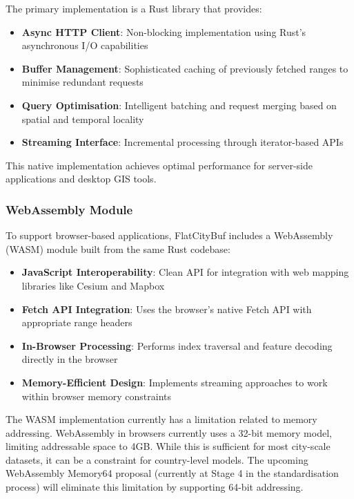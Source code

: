 The primary implementation is a Rust library that provides:

\begin{itemize}
    \item \textbf{Async HTTP Client}: Non-blocking implementation using Rust's asynchronous I/O capabilities
    \item \textbf{Buffer Management}: Sophisticated caching of previously fetched ranges to minimise redundant requests
    \item \textbf{Query Optimisation}: Intelligent batching and request merging based on spatial and temporal locality
    \item \textbf{Streaming Interface}: Incremental processing through iterator-based APIs
\end{itemize}

This native implementation achieves optimal performance for server-side applications and desktop GIS tools.

\subsubsection{WebAssembly Module}
\label{methodology:http_range_requests:cross_platform_implementation:webassembly_module}

To support browser-based applications, FlatCityBuf includes a WebAssembly (WASM) module built from the same Rust codebase:

\begin{itemize}
    \item \textbf{JavaScript Interoperability}: Clean API for integration with web mapping libraries like Cesium and Mapbox
    \item \textbf{Fetch API Integration}: Uses the browser's native Fetch API with appropriate range headers
    \item \textbf{In-Browser Processing}: Performs index traversal and feature decoding directly in the browser
    \item \textbf{Memory-Efficient Design}: Implements streaming approaches to work within browser memory constraints
\end{itemize}

The WASM implementation currently has a limitation related to memory addressing. WebAssembly in browsers currently uses a 32-bit memory model, limiting addressable space to 4GB. While this is sufficient for most city-scale datasets, it can be a constraint for country-level models. The upcoming WebAssembly Memory64 proposal (currently at Stage 4 in the standardisation process) will eliminate this limitation by supporting 64-bit addressing.

